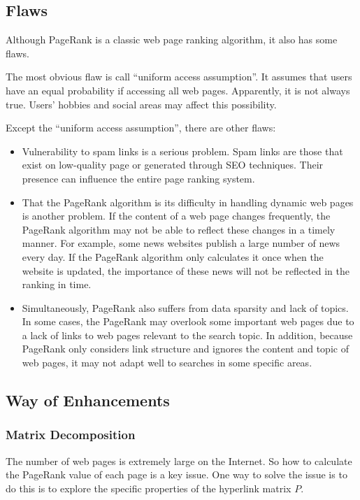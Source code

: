 \documentclass[lettersize,journal,12pt]{IEEEtran}
\begin{document}
\subsection{Flaws}

Although PageRank is a classic web page ranking algorithm, it also has some flaws.

The most obvious flaw is call ``uniform access assumption''. It assumes that users have an equal probability if accessing all web pages. Apparently, it is not always true. Users' hobbies and social areas may affect this possibility.

Except the ``uniform access assumption'', there are other flaws:
\begin{itemize}
	\item Vulnerability to spam links is a serious problem. Spam links are those that exist on low-quality page or generated through SEO techniques. Their presence can influence the entire page ranking system.
	\item That the PageRank algorithm is its difficulty in handling dynamic web pages is another problem. If the content of a web page changes frequently, the PageRank algorithm may not be able to reflect these changes in a timely manner. For example, some news websites publish a large number of news every day. If the PageRank algorithm only calculates it once when the website is updated, the importance of these news will not be reflected in the ranking in time.
	\item Simultaneously, PageRank also suffers from data sparsity and lack of topics. In some cases, the PageRank may overlook some important web pages due to a lack of links to web pages relevant to the search topic. In addition, because PageRank only considers link structure and ignores the content and topic of web pages, it may not adapt well to searches in some specific areas.
\end{itemize}

\subsection{Way of Enhancements}

\subsubsection{Matrix Decomposition}
The number of web pages is extremely large on the Internet. So how to calculate the PageRank value of each page is a key issue. One way to solve the issue is to do this is to explore the specific properties of the hyperlink matrix $P$.
\end{document}
